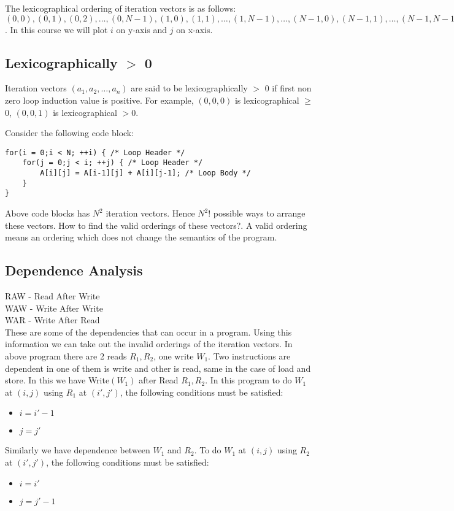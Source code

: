 \documentclass{article}
\begin{document}
The lexicographical ordering of iteration vectors is as follows:
$(0,0), (0,1), (0,2), \ldots, (0,N-1), (1,0), (1,1), \ldots, (1,N-1), \ldots, (N-1,0), (N-1,1), \ldots, (N-1,N-1)$. In this course we will plot $i$ on y-axis and $j$ on x-axis.

\subsection*{Lexicographically $>$ 0}
Iteration vectors $(a_1,a_2,\ldots,a_n)$ are said to be lexicographically $>$ 0 if first non zero loop induction value is positive. For example, $(0,0,0)$ is lexicographical $ \geq $ 0, $(0,0,1)$ is lexicographical $ > 0$. 

Consider the following code block:
\begin{lstlisting}
for(i = 0;i < N; ++i) { /* Loop Header */
    for(j = 0;j < i; ++j) { /* Loop Header */
        A[i][j] = A[i-1][j] + A[i][j-1]; /* Loop Body */
    }
}
\end{lstlisting}
Above code blocks has $N^2$ iteration vectors. Hence $N^2 ! $ possible ways to arrange these vectors. How to find the valid orderings of these vectors?. A valid ordering means an ordering which does not change the semantics of the program.

\subsection*{Dependence Analysis}
RAW - Read After Write \\
WAW - Write After Write \\
WAR - Write After Read \\

These are some of the dependencies that can occur in a program. Using this information we can take out the invalid orderings of the iteration vectors. In above program there are 2 reads $R_1, R_2$, one write $W_1$. Two instructions are dependent in one of them is write and other is read, same in the case of load and store. In this we have Write$(W_1)$ after Read $R_1,R_2$. In this program to do $W_1$ at $(i,j)$ using $R_1$ at $(i',j')$, the following conditions must be satisfied:
\begin{itemize}
    \item $i = i'-1$
    \item $j = j'$
\end{itemize}

Similarly we have dependence between $W_1$ and $R_2$. To do $W_1$ at $(i,j)$ using $R_2$ at $(i',j')$, the following conditions must be satisfied:
\begin{itemize}
    \item $i = i'$
    \item $j = j'-1$
\end{itemize}
\end{document}

